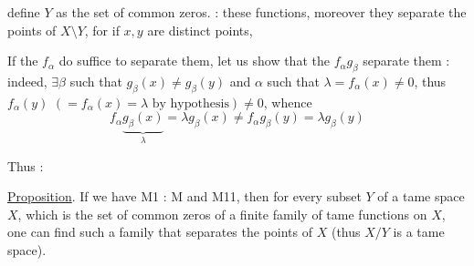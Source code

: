 
define $Y$ as the set of common zeros.  : these functions, moreover they separate the points of $X\setminus Y$, for if $x,y$ are distinct points, 

If the $f_\alpha$ do  suffice to separate them, let us show that the $f_\alpha g_\beta$ separate them : indeed, $\exists\beta$ such that $g_\beta(x)\ne g_\beta(y)$  and $\alpha$ such that $\lambda=f_\alpha(x)\ne0$, thus $f_\alpha(y)$ $(=f_\alpha(x)=\lambda\text{ by hypothesis})\ne0$, whence
\[
f_\alpha\underbrace{g_\beta(x)}_{\lambda}=\lambda g_\beta(x)\ne f_\alpha g_\beta(y)=\lambda g_\beta(y)
\]

Thus :

\uline{Proposition}. If we have M1 : M and M11, then for every   subset $Y$ of a tame space $X$, which is the set of common zeros of a finite family of tame functions on $X$, one can find such a family that separates the points of $X$ (thus $X/Y$ is a tame space).

